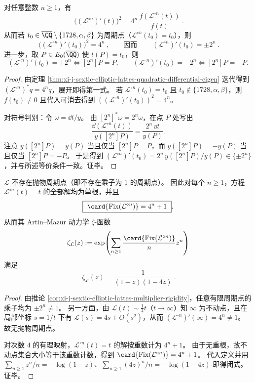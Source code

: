 \begin{corollary}[迭代导数的望远镜恒等式与周期乘子刚性]\label{cor:xi-j-sextic-elliptic-lattes-multiplier-rigidity}
对任意整数 \(n\ge 1\)，有
\[
\boxed{\ \bigl((\mathcal L^{\circ n})'(t)\bigr)^2
=4^n\,\frac{f(\mathcal L^{\circ n}(t))}{f(t)}\ }.
\]
从而若 \(t_0\in\overline{\QQ}\setminus\{1728,\alpha,\beta\}\) 为周期点（\(\mathcal L^{\circ n}(t_0)=t_0\)），则
\[
\boxed{\ \bigl((\mathcal L^{\circ n})'(t_0)\bigr)^2=4^n\ },
\qquad\text{因而}\qquad
\boxed{\ (\mathcal L^{\circ n})'(t_0)=\pm 2^n\ }.
\]
进一步，取 \(P\in E_0(\overline{\QQ})\) 使 \(t(P)=t_0\)，则
\[
(\mathcal L^{\circ n})'(t_0)=+2^n\iff [2^n]P=P,
\qquad
(\mathcal L^{\circ n})'(t_0)=-2^n\iff [2^n]P=-P.
\]
\end{corollary}
\begin{proof}
由定理 \ref{thm:xi-j-sextic-elliptic-lattes-quadratic-differential-eigen} 迭代得到 \((\mathcal L^{\circ n})^\ast q=4^n q\)，展开即得第一式。
若 \(\mathcal L^{\circ n}(t_0)=t_0\) 且 \(t_0\notin\{1728,\alpha,\beta\}\)，则 \(f(t_0)\neq 0\) 且代入可消去得到 \(((\mathcal L^{\circ n})'(t_0))^2=4^n\)。
\par
对符号判别：令 \(\omega=\dd t/y\)。
由 \([2^n]^\ast\omega=2^n\omega\)，在点 \(P\) 处写出
\[
\frac{\dd(\mathcal L^{\circ n}(t))}{y([2^n]P)}=\frac{2^n\,\dd t}{y(P)}.
\]
注意 \(y([2^n]P)=y(P)\) 当且仅当 \([2^n]P=P\)，而 \(y([2^n]P)=-y(P)\) 当且仅当 \([2^n]P=-P\)。
于是得到 \((\mathcal L^{\circ n})'(t_0)=2^n\,y([2^n]P)/y(P)\in\{\pm 2^n\}\)，并与所述等价条件一致。证毕。
\end{proof}

\begin{corollary}\label{cor:xi-j-sextic-elliptic-lattes-artin-mazur-zeta}
\(\mathcal L\) 不存在抛物周期点（即不存在乘子为 \(1\) 的周期点）。
因此对每个 \(n\ge 1\)，方程 \(\mathcal L^{\circ n}(t)=t\) 的全部解均为单根，并且
\[
\boxed{\ \card{\mathrm{Fix}(\mathcal L^{\circ n})}=4^n+1\ }.
\]
从而其 Artin--Mazur 动力学 \(\zeta\)-函数
\[
\zeta_{\mathcal L}(z):=\exp\!\left(\sum_{n\ge 1}\frac{\card{\mathrm{Fix}(\mathcal L^{\circ n})}}{n}z^n\right)
\]
满足
\[
\boxed{\ \zeta_{\mathcal L}(z)=\frac{1}{(1-z)(1-4z)}\ }.
\]
\end{corollary}
\begin{proof}
由推论 \ref{cor:xi-j-sextic-elliptic-lattes-multiplier-rigidity}，任意有限周期点的乘子均为 \(\pm 2^n\neq 1\)。
另一方面，由 \(\mathcal L(t)\sim \tfrac14 t\)（\(t\to\infty\)）知 \(\infty\) 为不动点，且在局部坐标 \(s=1/t\) 下有 \(\mathcal L(s)=4s+O(s^2)\)，从而 \((\mathcal L^{\circ n})'(\infty)=4^n\neq 1\)。
故无抛物周期点。
\par
对次数 \(4\) 的有理映射，\(\mathcal L^{\circ n}(t)=t\) 的解按重数计为 \(4^n+1\)。
由于无重根，故不动点集合大小等于该重数计数，得到 \(\card{\mathrm{Fix}(\mathcal L^{\circ n})}=4^n+1\)。
代入定义并用 \(\sum_{n\ge1}z^n/n=-\log(1-z)\)、\(\sum_{n\ge1}(4z)^n/n=-\log(1-4z)\) 即得闭式。证毕。
\end{proof}

